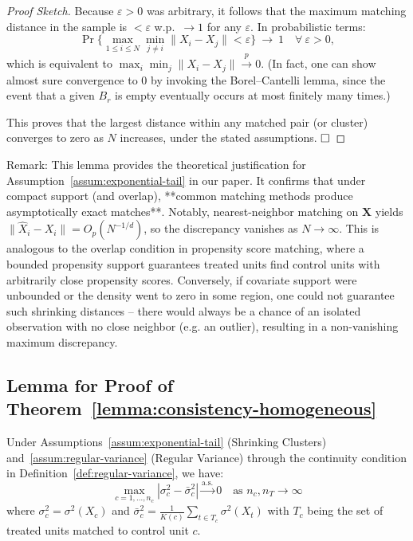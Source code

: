 \documentclass{mytemplate}
\begin{document}
\begin{proof}[Proof Sketch]
Because $\varepsilon>0$ was arbitrary, it follows that the maximum matching distance in the sample is $<\varepsilon$ w.p.~$\to1$ for any $\varepsilon$. In probabilistic terms:
$$
\Pr\Big\{\max_{1\le i\le N}\min_{j\neq i}\|X_i-X_j\| < \varepsilon\Big\} ~\to~ 1 \quad \forall~\varepsilon>0,
$$ 
which is equivalent to $\max_i \min_{j}\|X_i-X_j\| \xrightarrow{p} 0$. (In fact, one can show almost sure convergence to 0 by invoking the Borel–Cantelli lemma, since the event that a given $B_r$ is empty eventually occurs at most finitely many times.)

This proves that the largest distance within any matched pair (or cluster) converges to zero as $N$ increases, under the stated assumptions. $\hfill\square$
\end{proof}

Remark: This lemma provides the theoretical justification for Assumption~\ref{assum:exponential-tail} in our paper. It confirms that under compact support (and overlap), **common matching methods produce asymptotically exact matches**. Notably, nearest-neighbor matching on $\mathbf{X}$ yields $\|\widehat X_i - X_i\| = O_p(N^{-1/d})$, so the discrepancy vanishes as $N\to\infty$. This is analogous to the overlap condition in propensity score matching, where a bounded propensity support guarantees treated units find control units with arbitrarily close propensity scores. Conversely, if covariate support were unbounded or the density went to zero in some region, one could not guarantee such shrinking distances – there would always be a chance of an isolated observation with no close neighbor (e.g. an outlier), resulting in a non-vanishing maximum discrepancy.


\subsection{Lemma for Proof of Theorem~\ref{lemma:consistency-homogeneous}}

\begin{lemma}
\label{lemma:uniform-variance-convergence}
Under Assumptions~\ref{assum:exponential-tail} (Shrinking Clusters) and~\ref{assum:regular-variance} (Regular Variance) through the continuity condition in Definition~\ref{def:regular-variance}, we have:
\begin{equation}
\max_{c=1,\ldots,n_c}|\sigma_c^2 - \bar{\sigma}_c^2| \xrightarrow{\text{a.s.}} 0 \quad \text{as } n_c, n_T \to \infty
\end{equation}
where $\sigma_c^2 = \sigma^2(X_c)$ and $\bar{\sigma}_c^2 = \frac{1}{K(c)}\sum_{t \in T_c}\sigma^2(X_t)$ with $T_c$ being the set of treated units matched to control unit $c$.
\end{lemma}
\end{document}
